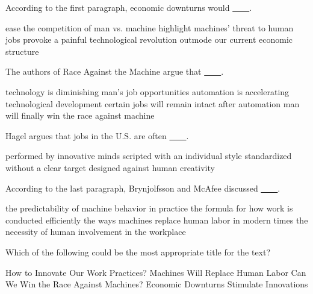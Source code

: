 \item According to the first paragraph, economic downturns would \uline{~~~~}.
\begin{tasks}
	\task ease the competition of man vs. machine
	\task highlight machines' threat to human jobs
	\task provoke a painful technological revolution
	\task outmode our current economic structure
\end{tasks}
\item The authors of Race Against the Machine argue that \uline{~~~~}.
\begin{tasks}
	\task technology is diminishing man's job opportunities
	\task automation is accelerating technological development
	\task certain jobs will remain intact after automation
	\task man will finally win the race against machine
\end{tasks}
\item Hagel argues that jobs in the U.S. are often \uline{~~~~}.
\begin{tasks}
	\task performed by innovative minds
	\task scripted with an individual style
	\task standardized without a clear target
	\task designed against human creativity
\end{tasks}
\item According to the last paragraph, Brynjolfsson and McAfee discussed \uline{~~~~}.
\begin{tasks}
	\task the predictability of machine behavior in practice
	\task the formula for how work is conducted efficiently
	\task the ways machines replace human labor in modern times
	\task the necessity of human involvement in the workplace
\end{tasks}
\item Which of the following could be the most appropriate title for the text?
\begin{tasks}
	\task How to Innovate Our Work Practices?
	\task Machines Will Replace Human Labor
	\task Can We Win the Race Against Machines?
	\task Economic Downturns Stimulate Innovations
\end{tasks}
